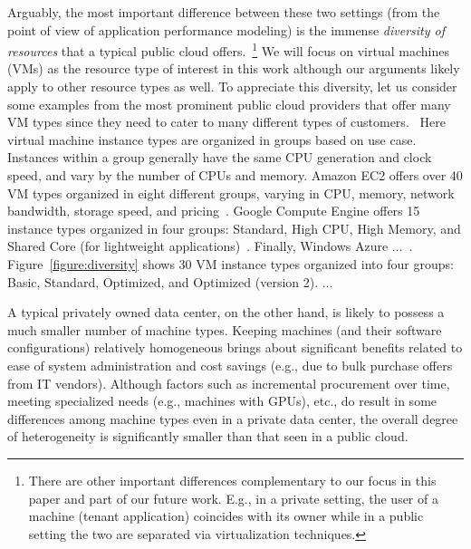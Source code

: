 \documentclass{acm_proc_article-sp}
\newcommand{\mm}[1]{{\color{red}#1}}
\begin{document}
Arguably, the most important difference between  these two settings (from the point of view of application performance modeling) is the immense {\it diversity of resources} that a typical public cloud offers.~\footnote{There are other important differences complementary to our focus in this paper and part of our future work. E.g., in a private setting, the user of a machine (tenant application) coincides with its owner while in a public setting the two are separated via virtualization techniques. } We will focus on virtual machines (VMs) as the resource type of interest in this work although our arguments likely apply to other resource types as well. To appreciate this diversity, let us consider some examples from the most prominent public cloud providers that offer many VM types since they need to cater to many different types of customers.  ~\mm{Here virtual machine instance types are organized in groups based on use case.  Instances within a group generally have the same CPU generation and clock speed, and vary by the number of CPUs and memory.  Amazon EC2 offers over 40 VM types organized in eight different groups, varying in CPU, memory, network bandwidth, storage speed, and pricing~\cite{amazon-ec2}. Google Compute Engine offers 15 instance types organized in four groups: Standard, High CPU, High Memory, and Shared Core (for lightweight applications)~\cite{googlecomputeengine}. Finally, Windows Azure ...~\cite{windowsazure}. Figure~\ref{figure:diversity} shows 30 VM instance types organized into four groups: Basic, Standard, Optimized, and Optimized (version 2). ...} 

A typical privately owned data center, on the other hand, is likely to possess a much smaller number of machine types. Keeping machines (and their software configurations) relatively homogeneous brings about significant benefits related to ease of system administration and cost savings (e.g., due to bulk purchase offers from IT vendors). Although factors such as incremental procurement over time, meeting specialized needs (e.g., machines with GPUs), etc.,  do result in some differences among machine types even in a private data center, the overall degree of heterogeneity is significantly smaller than that seen in a  public cloud.

 
\end{document}
